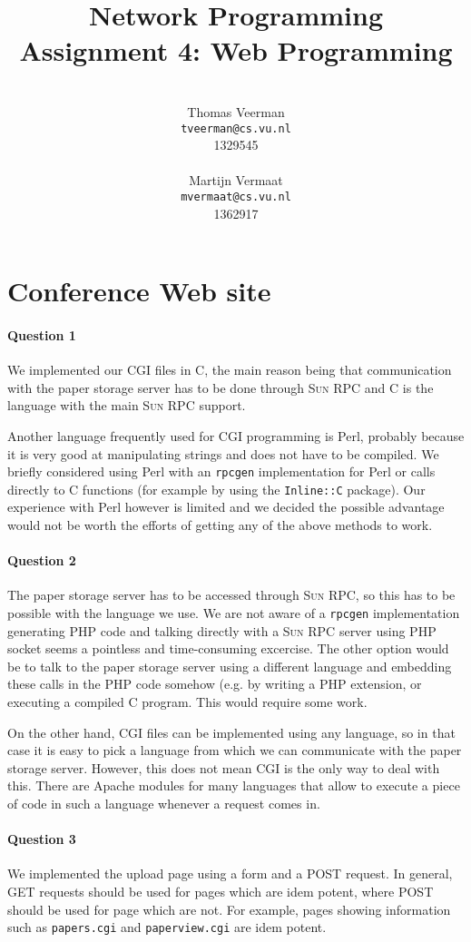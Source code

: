 \documentclass[a4paper,10pt]{article}
\title{Network Programming\\
\small{Assignment 4: Web Programming}}
\author{%
        \mbox{}\\
        Thomas Veerman\\
        \texttt{tveerman@cs.vu.nl}\\
        1329545\\
        \mbox{}\\
        Martijn Vermaat\\
        \texttt{mvermaat@cs.vu.nl}\\
        1362917
}
\begin{document}
\maketitle

\section{Conference Web site}
\paragraph{Question 1}
We implemented our \textsc{CGI} files in C, the main reason being that
communication with the paper storage server has to be done through \textsc{Sun RPC}
and C is the language with the main \textsc{Sun RPC} support.

Another language frequently used for \textsc{CGI} programming is Perl,
probably because it is very good at manipulating strings and does not have to
be compiled. We briefly considered using Perl with an \texttt{rpcgen}
implementation for Perl or calls directly to C functions (for
example by using the \texttt{Inline::C} package). Our experience with Perl
however is limited and we decided the possible advantage would not be worth the
efforts of getting any of the above methods to work.

\paragraph{Question 2}
The paper storage server has to be accessed through \textsc{Sun RPC}, so this has
to be possible with the language we use. We are not aware of a \texttt{rpcgen}
implementation generating PHP code and talking directly with a \textsc{Sun RPC}
server using PHP socket seems a pointless and time-consuming excercise. The
other option would be to talk to the paper storage server using a different language
and embedding these calls in the PHP code somehow (e.g. by writing a PHP
extension, or executing a compiled C program. This would require some work.

On the other hand, \textsc{CGI} files can be implemented using any language, so in
that case it is easy to pick a language from which we can communicate with the
paper storage server. However, this does not mean \textsc{CGI} is the only way to
deal with this. There are Apache modules for many languages that allow to
execute a piece of code in such a language whenever a request comes in.

\paragraph{Question 3}
We implemented the upload page using a form and a \textsc{POST} request. In general,
\textsc{GET} requests should be used for pages which are idem potent, where 
\textsc{POST} should be used for page which are not. For example, pages showing
information such as \texttt{papers.cgi} and \texttt{paperview.cgi} are idem potent.
\end{document}
